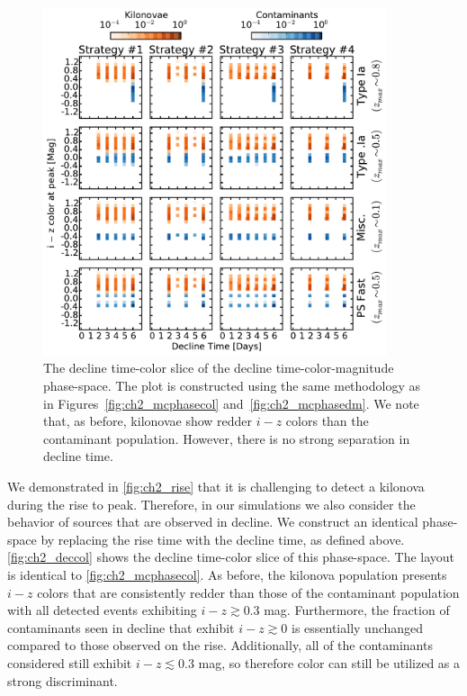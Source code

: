 \begin{figure}[t!]
\centering
\includegraphics[width=0.9\textwidth]{./figs/chapter2/ch2_f10.pdf}
\caption{The decline time-color slice of the decline time-color-magnitude phase-space. The plot is constructed using the same methodology as in Figures~\ref{fig:ch2_mcphasecol} and~\ref{fig:ch2_mcphasedm}. We note that, as before, kilonovae show redder $i-z$ colors than the contaminant population. However, there is no strong separation in decline time.}
\label{fig:ch2_deccol}
\end{figure}

We demonstrated in \autoref{fig:ch2_rise} that it is challenging to detect a kilonova during the rise to peak. Therefore, in our simulations we also consider the behavior of sources that are observed in decline. We construct an identical phase-space by replacing the rise time with the decline time, as defined above. \autoref{fig:ch2_deccol} shows the decline time-color slice of this phase-space. The layout is identical to \autoref{fig:ch2_mcphasecol}. As before, the kilonova population presents $i-z$ colors that are consistently redder than those of the contaminant population with all detected events exhibiting $i-z \gtrsim 0.3$ mag. Furthermore, the fraction of contaminants seen in decline that exhibit $i-z\gtrsim0$ is essentially unchanged compared to those observed on the rise. Additionally, all of the contaminants considered still exhibit $i-z \lesssim 0.3$ mag, so therefore color can still be utilized as a strong discriminant.

